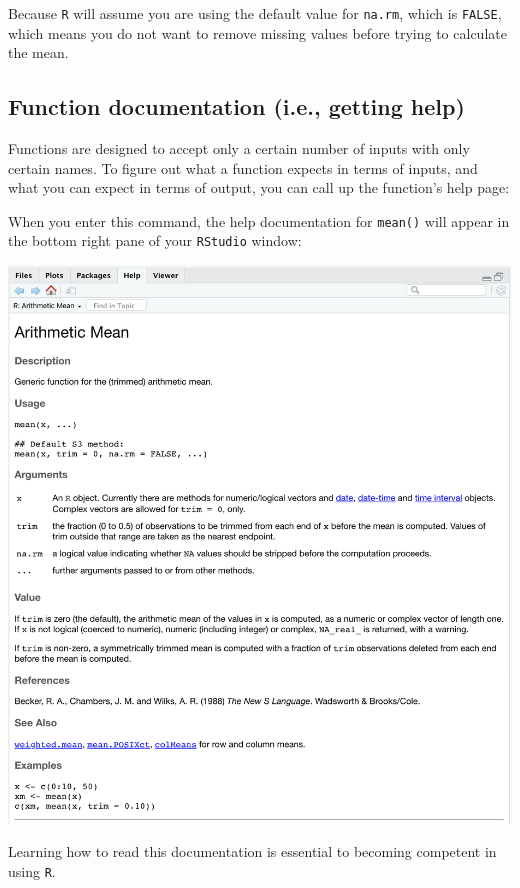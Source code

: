 \documentclass[
]{book}
\begin{document}
Because \texttt{R} will assume you are using the default value for \texttt{na.rm}, which is \texttt{FALSE}, which means you do not want to remove missing values before trying to calculate the mean.

\hypertarget{function-documentation-i.e.-getting-help}{%
\subsection*{Function documentation (i.e., getting help)}\label{function-documentation-i.e.-getting-help}}

Functions are designed to accept only a certain number of inputs with only certain names. To figure out what a function expects in terms of inputs, and what you can expect in terms of output, you can call up the function's help page:

When you enter this command, the help documentation for \texttt{mean()} will appear in the bottom right pane of your \texttt{RStudio} window:

\includegraphics{img/functions_help.png}

Learning how to read this documentation is essential to becoming competent in using \texttt{R}.
\end{document}
